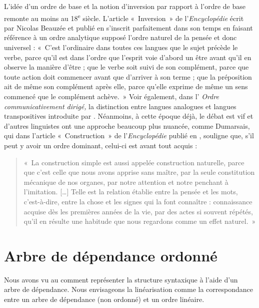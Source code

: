 {    L’idée d’un ordre de base et la notion d’inversion par rapport à l’ordre de base remonte au moins au 18\textsuperscript{e} siècle. L’article «~Inversion~» de l’\textit{Encyclopédie} écrit par Nicolas Beauzée et publié en \citeyear{Beauzée1765} s’inscrit parfaitement dans son temps en faisant référence à un ordre analytique supposé l’ordre naturel de la pensée et donc universel : «~C’est l’ordinaire dans toutes ces langues que le sujet précède le verbe, parce qu’il est dans l’ordre que l’esprit voie d’abord un être avant qu’il en observe la manière d’être ; que le verbe soit suivi de son complément, parce que toute action doit commencer avant que d’arriver à son terme ; que la préposition ait de même son complément après elle, parce qu’elle exprime de même un sens commencé que le complément achève.~» Voir également, dans l’ \textit{Ordre communicativement dirigé,} la distinction entre langues analogues et langues transpositives introduite par \citet{girard1747vrais}. Néanmoins, à cette époque déjà, le débat est vif et d’autres linguistes ont une approche beaucoup plus nuancée, comme Dumarsais, qui dans l’article «~Construction~» de l’\textit{Encyclopédie} publié en \citeyear{Dumarsais1754}, souligne que, s’il peut y avoir un ordre dominant, celui-ci est avant tout acquis : 
    \begin{quote}
   «~La construction simple est aussi appelée construction naturelle, parce que c’est celle que nous avons apprise sans maître, par la seule constitution mécanique de nos organes, par notre attention et notre penchant à l’imitation. […] Telle est la relation établie entre la pensée et les mots, c’est-à-dire, entre la chose et les signes qui la font connaître : connaissance acquise dès les premières années de la vie, par des actes si souvent répétés, qu’il en résulte une habitude que nous regardons comme un effet naturel.~»
    \end{quote}
}
\section{Arbre de dépendance ordonné}\label{sec:3.5.9}

Nous avons vu au  comment représenter la structure syntaxique à l’aide d’un arbre de dépendance. Nous envisageons la linéarisation comme la correspondance entre un arbre de dépendance (non ordonné) et un ordre linéaire. 


